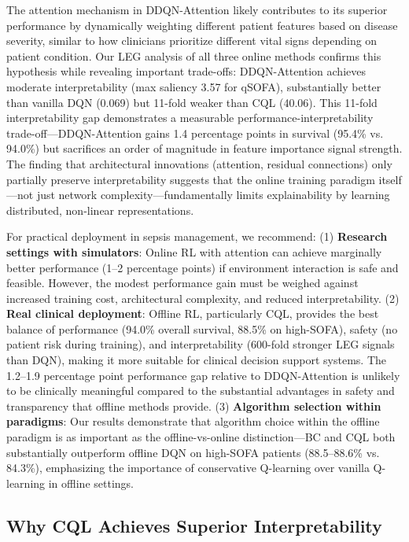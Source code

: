 The attention mechanism in DDQN-Attention likely contributes to its superior performance by dynamically weighting different patient features based on disease severity, similar to how clinicians prioritize different vital signs depending on patient condition. Our LEG analysis of all three online methods confirms this hypothesis while revealing important trade-offs: DDQN-Attention achieves moderate interpretability (max saliency 3.57 for qSOFA), substantially better than vanilla DQN (0.069) but 11-fold weaker than CQL (40.06). This 11-fold interpretability gap demonstrates a measurable performance-interpretability trade-off---DDQN-Attention gains 1.4 percentage points in survival (95.4\% vs. 94.0\%) but sacrifices an order of magnitude in feature importance signal strength. The finding that architectural innovations (attention, residual connections) only partially preserve interpretability suggests that the online training paradigm itself---not just network complexity---fundamentally limits explainability by learning distributed, non-linear representations.

For practical deployment in sepsis management, we recommend: (1) \textbf{Research settings with simulators}: Online RL with attention can achieve marginally better performance (1--2 percentage points) if environment interaction is safe and feasible. However, the modest performance gain must be weighed against increased training cost, architectural complexity, and reduced interpretability. (2) \textbf{Real clinical deployment}: Offline RL, particularly CQL, provides the best balance of performance (94.0\% overall survival, 88.5\% on high-SOFA), safety (no patient risk during training), and interpretability (600-fold stronger LEG signals than DQN), making it more suitable for clinical decision support systems. The 1.2--1.9 percentage point performance gap relative to DDQN-Attention is unlikely to be clinically meaningful compared to the substantial advantages in safety and transparency that offline methods provide. (3) \textbf{Algorithm selection within paradigms}: Our results demonstrate that algorithm choice within the offline paradigm is as important as the offline-vs-online distinction—BC and CQL both substantially outperform offline DQN on high-SOFA patients (88.5--88.6\% vs. 84.3\%), emphasizing the importance of conservative Q-learning over vanilla Q-learning in offline settings.


\subsection{Why CQL Achieves Superior Interpretability}\label{sec:discussion:mechanism}


